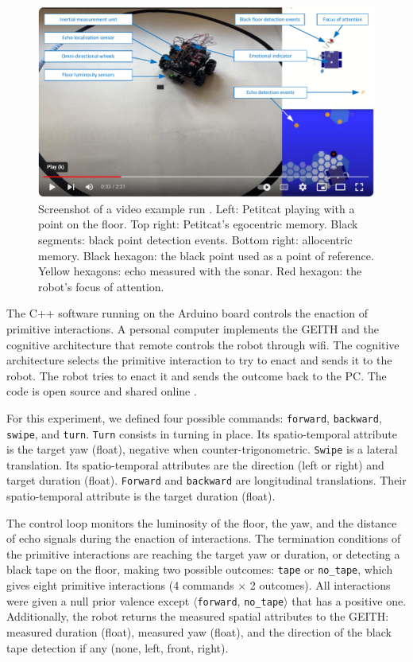 \documentclass[runningheads]{llncs}
\begin{document}
\begin{figure}
	\includegraphics[width=\textwidth]{Figure_video.pdf}
	\caption{Screenshot of a video example run \cite{georgeon_petitcat_2024}.
		Left: Petitcat playing with a point on the floor.
		Top right: Petitcat's egocentric memory. Black segments: black point detection events. 
		Bottom right: allocentric memory. Black hexagon: the black point used as a point of reference. Yellow hexagons: echo measured with the sonar. Red hexagon: the robot's focus of attention.} \label{fig:video}
\end{figure}

The C++ software running on the Arduino board controls the enaction of primitive interactions. 
A personal computer implements the GEITH and the cognitive architecture that remote controls the robot through wifi.
The cognitive architecture selects the primitive interaction to try to enact and sends it to the robot. 
The robot tries to enact it and sends the outcome back to the PC.  
The code is open source and shared online \cite{petitcat_github}.

For this experiment, we defined four possible commands: \texttt{forward}, \texttt{backward}, \texttt{swipe}, and \texttt{turn}. 
\texttt{Turn} consists in turning in place. Its spatio-temporal attribute is the target yaw (float), negative when counter-trigonometric. 
\texttt{Swipe} is a lateral translation. Its spatio-temporal attributes are the direction (left or right) and target duration (float). 
\texttt{Forward} and \texttt{backward} are longitudinal translations. Their spatio-temporal attribute is the target duration (float).   

The control loop monitors the luminosity of the floor, the yaw, and the distance of echo signals during the enaction of interactions. 
The termination conditions of the primitive interactions are reaching the target yaw or duration, or detecting a black tape on the floor, making two possible outcomes: \texttt{tape} or \texttt{no\_tape}, which gives eight primitive interactions (4 commands $\times$ 2 outcomes).
All interactions were given a null prior valence except $\langle$\texttt{forward}, \texttt{no\_tape}$\rangle$ that has a positive one.
Additionally, the robot returns the measured spatial attributes to the GEITH: measured duration (float), measured yaw (float), and the direction of the black tape detection if any (none, left, front, right). 
\end{document}
